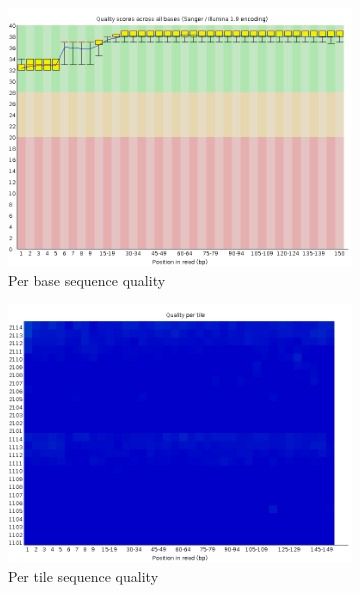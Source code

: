 \documentclass{article}
\begin{document}
\begin{figure}[htbp]
\centering
\begin{subfigure}{0.45\linewidth}
\includegraphics[width=\linewidth]{04-R1.qfilter_fastqc/Images/per_base_quality.png}
\caption{Per base sequence quality}
\end{subfigure}
\begin{subfigure}{0.45\linewidth}
\includegraphics[width=\linewidth]{04-R1.qfilter_fastqc/Images/per_tile_quality.png}
\caption{Per tile sequence quality}
\end{subfigure}
\begin{subfigure}{0.45\linewidth}

\end{subfigure}
\end{figure}
\end{document}
